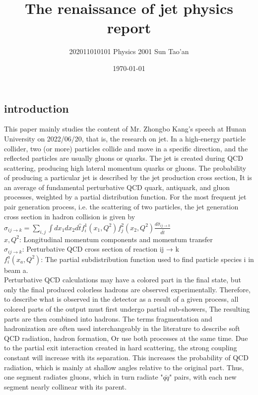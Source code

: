 \documentclass[12pt, a4paper, oneside]{article}
\title{The renaissance of jet physics report}
\date{\today}
\author{202011010101 Physics 2001 Sun Tao'an}
\begin{document}
\begin{spacing}{2.0}
\maketitle
\section{introduction}
This paper mainly studies the content of Mr. Zhongbo Kang's speech at Hunan University on 2022/06/20, that is, the research on jet.
In a high-energy particle collider, two (or more) particles collide and move in a specific direction, and the reflected particles are usually gluons or quarks.
The jet is created during QCD scattering, producing high lateral momentum quarks or gluons. The probability of producing a particular jet is described by the jet production cross section,
It is an average of fundamental perturbative QCD quark, antiquark, and gluon processes, weighted by a partial distribution function.
For the most frequent jet pair generation process, i.e. the scattering of two particles, the jet generation cross section in hadron collision is given by
$\sigma_{i j \rightarrow k}=\sum_{i, j} \int d x_{1} d x_{2} d \hat{t} f_{i}^{1}\left(x_{1} , Q^{2}\right) f_{j}^{2}\left(x_{2}, Q^{2}\right) \frac{d \hat{\sigma}_{i j \rightarrow k} }{d \hat{t}}$\\
$x, Q^2$: Longitudinal momentum components and momentum transfer\\
$\hat{\sigma}_{i j \rightarrow k}$: Perturbative QCD cross section of reaction ij → k\\
$f_{i}^{a}\left(x_{a}, Q^{2}\right)$: The partial subdistribution function used to find particle species i in beam a. \\
Perturbative QCD calculations may have a colored part in the final state, but only the final produced colorless hadrons are observed experimentally.
Therefore, to describe what is observed in the detector as a result of a given process, all colored parts of the output must first undergo partial sub-showers,
The resulting parts are then combined into hadrons. The terms fragmentation and hadronization are often used interchangeably in the literature to describe soft QCD radiation, hadron formation,
Or use both processes at the same time.
Due to the partial exit interaction created in hard scattering, the strong coupling constant will increase with its separation.
This increases the probability of QCD radiation, which is mainly at shallow angles relative to the original part. Thus, one segment radiates gluons, which in turn radiate "$\bar{qq}$" pairs, with each new segment nearly collinear with its parent.


\end{spacing}
\end{document}
